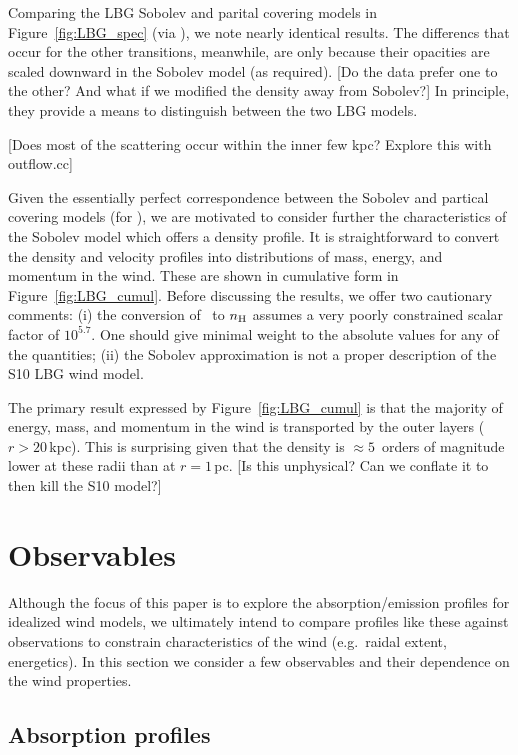 \documentclass[12pt,preprint]{aastex}
\begin{document}
Comparing the LBG Sobolev and parital covering models in
Figure~\ref{fig:LBG_spec} (via \mgiia), we note nearly identical
results.  The differencs that occur for the other transitions,
meanwhile, are only because their opacities are scaled downward in the
Sobolev model (as required).  [Do the data prefer one to the other?
And what if we modified the density away from Sobolev?]
In principle, they provide a means to distinguish between the two LBG
models.  

[Does most of the scattering occur within the inner few kpc? Explore
this with outflow.cc]

Given the essentially perfect correspondence between the Sobolev and
partical covering models (for \mgiia), we are motivated to consider
further the characteristics of the Sobolev model which offers a
density profile.  It is straightforward to convert the density and
velocity profiles into distributions of mass, energy, and momentum in
the wind.  These are shown in cumulative form in
Figure~\ref{fig:LBG_cumul}.  Before discussing the results, we offer
two cautionary comments: (i) the conversion of \nmg\ to $n_{\rm H}$
assumes a very poorly constrained scalar factor of $10^{5.7}$.  One
should give minimal weight to the absolute values for any of the
quantities;
(ii) the Sobolev approximation is not a proper description of the S10
LBG wind model.

The primary result expressed by Figure~\ref{fig:LBG_cumul} is that the
majority of energy, mass, and momentum in the wind is transported by
the outer layers ($r > 20$\,kpc).  This is surprising given that the
density is $\approx 5$~orders of magnitude lower at these radii than
at $r = 1$\,pc.  [Is this unphysical?  Can we conflate it to then kill
the S10 model?]

\section{Observables}
\label{sec:obs}

Although the focus of this paper is to explore the absorption/emission
profiles for idealized wind models, we ultimately intend to compare 
profiles like these against observations to constrain characteristics
of the wind (e.g.\ raidal extent, energetics).  In this section we
consider a few observables and their dependence on the wind properties.

\subsection{Absorption profiles}
\end{document}
